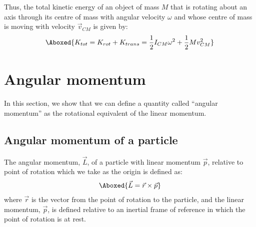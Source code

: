 Thus, the total kinetic energy of an object of mass $M$ that is rotating about an axis through its centre of mass with angular velocity $\omega$ and whose centre of mass is moving with velocity $\vec v_{CM}$ is given by:
\begin{align}
\Aboxed{K_{tot}=K_{rot}+K_{trans}=\frac{1}{2} I_{CM}\omega ^2 + \frac{1}{2}M v_{CM}^2} 
\end{align}

\section{Angular momentum}
In this section, we show that we can define a quantity called ``angular momentum'' as the rotational equivalent of the linear momentum.
\subsection{Angular momentum of a particle}
The angular momentum, $\vec L$, of a particle with linear momentum $\vec p$, relative to point of rotation which we take as the origin is defined as:
\begin{align}
\Aboxed{\vec L = \vec r\times \vec p}
\end{align}
where $\vec r$ is the vector from the point of rotation to the particle, and the linear momentum, $\vec p$, is defined relative to an inertial frame of reference in which the point of rotation is at rest.


